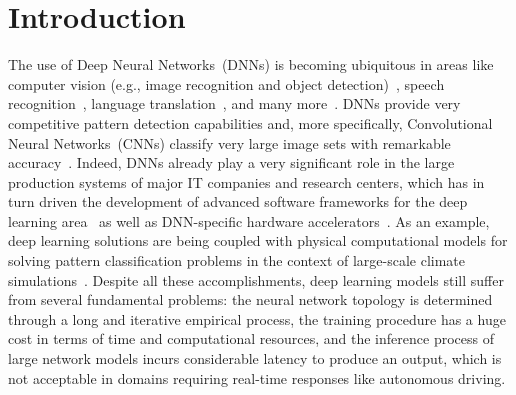 \section{Introduction}


The use of Deep Neural Networks~(DNNs) is becoming ubiquitous 
in areas like computer vision (e.g., image recognition and object detection)~\cite{alexnet, Inception}, speech recognition~\cite{Acoustic}, language translation~\cite{Language}, and many more~\cite{Ciregan2012}. 
DNNs provide very competitive pattern detection capabilities and, more specifically, Convolutional Neural Networks~(CNNs) classify very large image sets with remarkable accuracy~\cite{Krizhevsky2012}.
Indeed, DNNs already play a very significant role in the large production systems of major IT companies and research centers, which has in turn driven the development of advanced software frameworks for the deep learning area~\cite{tensorflow} as well as DNN-specific hardware accelerators~\cite{Merolla668,Jouppi2017}. 
As an example, deep learning solutions are being coupled with physical computational models  for solving pattern classification problems in the context of large-scale climate simulations~\cite{Kurth2017}.
Despite all these accomplishments, deep learning models still suffer from several fundamental problems: the neural network topology is determined through a long and iterative empirical process, the training procedure has a huge cost in terms of time and computational resources, and the inference process of large network models incurs considerable latency to produce an output, which is not acceptable in domains requiring real-time responses like autonomous driving.

